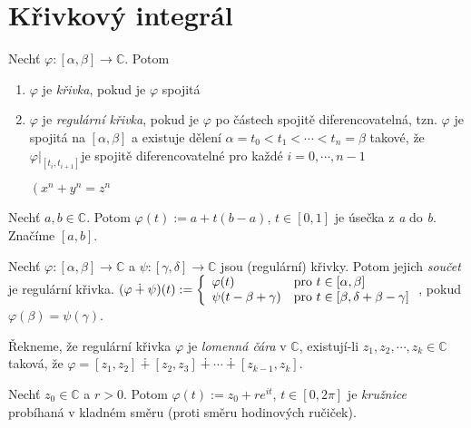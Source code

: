 \section{\texorpdfstring{Křivkový integrál}{Lg}}

\begin{definition}
Nechť $\varphi:[\alpha,\beta] \rightarrow \mathbb{C}$. Potom
\begin{enumerate}
    \item $\varphi$ je \emph{křivka}, pokud je $\varphi$ spojitá
    \item $\varphi$ je \emph{regulární křivka}, pokud je $\varphi$ po částech spojitě diferencovatelná, tzn. $\varphi$ je spojitá na $[\alpha,\beta]$ a existuje dělení $\alpha = t_0<t_1<\cdots <t_n=\beta$ takové, že
    $\varphi \Big\rvert
     _{[t_i,t_{i+1}]} 
    $je spojitě diferencovatelné pro každé $i=0,\cdots,n-1$
    
     $\left( x^n + y^n = z^n \right.$
\end{enumerate}
\end{definition}

\begin{definition}[Úsečka]
Nechť $a, b \in \mathbb{C}$. Potom $\varphi(t):= a + t(b-a)$, $ t \in [0,1]$ je úsečka z \emph{a} do \emph{b}. Značíme $[a,b]$.
\end{definition}

\begin{notation}
Nechť $\varphi:[\alpha,\beta]\rightarrow\mathbb{C}$ a $\psi:[\gamma,\delta]\rightarrow\mathbb{C}$ jsou (regulární) křivky. Potom jejich \emph{součet} je regulární křivka.
$(\varphi \dotplus \psi)(t) := 
\left\{ \begin{array}{ll}  \varphi(t)  & \mbox{pro } t \in[\alpha,\beta] \\ \psi(t-\beta+\gamma) & \mbox{pro } t \in[\beta,\delta+\beta-\gamma] \end{array} \right.$, pokud $\varphi(\beta)=\psi(\gamma)$.
\end{notation}

\begin{definition}
Řekneme, že regulární křivka $\varphi$ je \emph{lomenná čára} v $\mathbb{C}$, existují-li $z_1,z_2,\cdots,z_k \in \mathbb{C}$ taková, že $\varphi=[z_1,z_2]\dotplus[z_2,z_3]\dotplus\cdots\dotplus[z_{k-1},z_k]$.
\end{definition}


\begin{definition}[Kružnice]
Nechť $z_0\in\mathbb{C}$ a $r>0$. Potom $\varphi(t):=z_0+re^{it}$, $t\in [0,2\pi]$ je \emph{kružnice} probíhaná v kladném směru (proti směru hodinových ručiček).
\end{definition}

